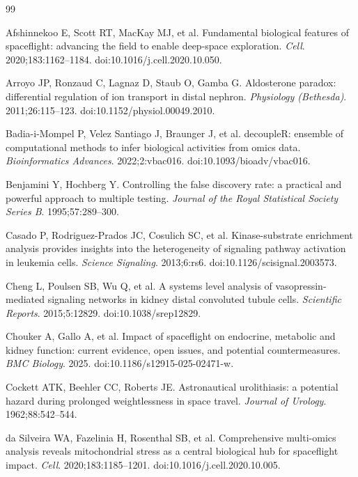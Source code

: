 \documentclass[11pt]{article}
\begin{document}
\clearpage
\begin{thebibliography}{99}\small

 Afshinnekoo E, Scott RT, MacKay MJ, et al. Fundamental biological features of spaceflight: advancing the field to enable deep-space exploration. \emph{Cell}. 2020;183:1162--1184. doi:10.1016/j.cell.2020.10.050.

 Arroyo JP, Ronzaud C, Lagnaz D, Staub O, Gamba G. Aldosterone paradox: differential regulation of ion transport in distal nephron. \emph{Physiology (Bethesda)}. 2011;26:115--123. doi:10.1152/physiol.00049.2010.

 Badia-i-Mompel P, Velez Santiago J, Braunger J, et al. decoupleR: ensemble of computational methods to infer biological activities from omics data. \emph{Bioinformatics Advances}. 2022;2:vbac016. doi:10.1093/bioadv/vbac016.

 Benjamini Y, Hochberg Y. Controlling the false discovery rate: a practical and powerful approach to multiple testing. \emph{Journal of the Royal Statistical Society Series B}. 1995;57:289--300.

 Casado P, Rodriguez-Prados JC, Cosulich SC, et al. Kinase-substrate enrichment analysis provides insights into the heterogeneity of signaling pathway activation in leukemia cells. \emph{Science Signaling}. 2013;6:rs6. doi:10.1126/scisignal.2003573.

 Cheng L, Poulsen SB, Wu Q, et al. A systems level analysis of vasopressin-mediated signaling networks in kidney distal convoluted tubule cells. \emph{Scientific Reports}. 2015;5:12829. doi:10.1038/srep12829.

 Chouker A, Gallo A, et al. Impact of spaceflight on endocrine, metabolic and kidney function: current evidence, open issues, and potential countermeasures. \emph{BMC Biology}. 2025. doi:10.1186/s12915-025-02471-w.

 Cockett ATK, Beehler CC, Roberts JE. Astronautical urolithiasis: a potential hazard during prolonged weightlessness in space travel. \emph{Journal of Urology}. 1962;88:542--544.

 da Silveira WA, Fazelinia H, Rosenthal SB, et al. Comprehensive multi-omics analysis reveals mitochondrial stress as a central biological hub for spaceflight impact. \emph{Cell}. 2020;183:1185--1201. doi:10.1016/j.cell.2020.10.005.


\end{thebibliography}
\end{document}
